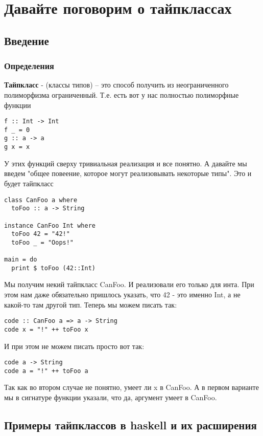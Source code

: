 \documentclass[10pt, a4paper]{article}
\begin{document}
\section{Давайте поговорим о тайпклассах}
\subsection{Введение}
\subsubsection{Определения}

{\bf Тайпкласс} - (классы типов) -- это способ получить из неограниченного полиморфизма ограниченный. Т.е. есть вот у нас полностью полиморфные функции

\begin{lstlisting}
f :: Int -> Int
f _ = 0
g :: a -> a
g x = x
\end{lstlisting} 

У этих функций сверху тривиальная реализация и все понятно. А давайте мы введем "общее повеение, которое могут реализовывать некоторые типы". Это и будет тайпкласс

\begin{lstlisting}
class CanFoo a where
  toFoo :: a -> String

instance CanFoo Int where
  toFoo 42 = "42!"
  toFoo _ = "Oops!"

main = do
  print $ toFoo (42::Int)
\end{lstlisting} 

Мы получим некий тайпкласс CanFoo. И реализовали его только для инта. При этом нам даже обязательно пришлось указать, что 42 - это именно Int, а не какой-то там другой тип. Теперь мы можем писать так:

\begin{lstlisting}
code :: CanFoo a => a -> String
code x = "!" ++ toFoo x
\end{lstlisting} 

И при этом не можем писать просто вот так:
\begin{lstlisting}
code a -> String
code a = "!" ++ toFoo a
\end{lstlisting}  

Так как во втором случае не понятно, умеет ли x в CanFoo. А в первом варианте мы в сигнатуре функции указали, что да, аргумент умеет в CanFoo.



\subsection{Примеры тайпклассов в haskell и их расширения}
\end{document}
